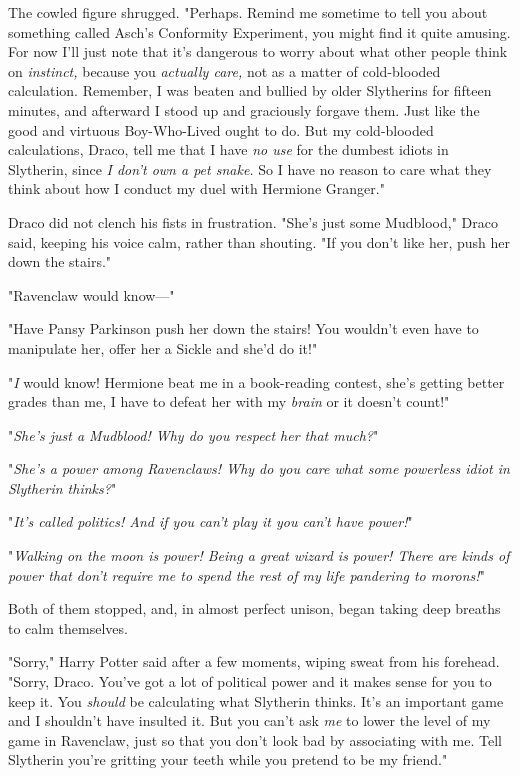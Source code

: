 The cowled figure shrugged. "Perhaps. Remind me sometime to tell you about
something called Asch's Conformity Experiment, you might find it quite amusing.
For now I'll just note that it's dangerous to worry about what other people
think on \emph{instinct,} because you \emph{actually care,} not as a matter of
cold-blooded calculation. Remember, I was beaten and bullied by older
Slytherins for fifteen minutes, and afterward I stood up and graciously forgave
them. Just like the good and virtuous Boy-Who-Lived ought to do. But my
cold-blooded calculations, Draco, tell me that I have \emph{no use} for the
dumbest idiots in Slytherin, since \emph{I don't own a pet snake.} So I have no
reason to care what they think about how I conduct my duel with Hermione
Granger."

Draco did not clench his fists in frustration. "She's just some Mudblood,"
Draco said, keeping his voice calm, rather than shouting. "If you don't like
her, push her down the stairs."

"Ravenclaw would know\mbox{---}"

"Have Pansy Parkinson push her down the stairs! You wouldn't even have to
manipulate her, offer her a Sickle and she'd do it!"

"\emph{I} would know! Hermione beat me in a book-reading contest, she's getting
better grades than me, I have to defeat her with my \emph{brain} or it doesn't
count!"

"\emph{She's just a Mudblood! Why do you respect her that much?}"

"\emph{She's a power among Ravenclaws! Why do you care what some powerless
idiot in Slytherin thinks?}"

"\emph{It's called politics! And if you can't play it you can't have power!}"

"\emph{Walking on the moon is power! Being a great wizard is power! There are
kinds of power that don't require me to spend the rest of my life pandering to
morons!}"

Both of them stopped, and, in almost perfect unison, began taking deep breaths
to calm themselves.

"Sorry," Harry Potter said after a few moments, wiping sweat from his forehead.
"Sorry, Draco. You've got a lot of political power and it makes sense for you
to keep it. You \emph{should} be calculating what Slytherin thinks. It's an
important game and I shouldn't have insulted it. But you can't ask \emph{me} to
lower the level of my game in Ravenclaw, just so that you don't look bad by
associating with me. Tell Slytherin you're gritting your teeth while you
pretend to be my friend."

